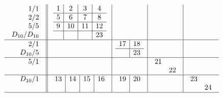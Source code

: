 \documentclass[12pt,a4paper]{amsart}
\begin{document}
\scriptsize {}
\begin{align*}
  \begin{array}{r||c|c|c|c}
    \begin{array}{r}
      1/1 \\ 2/2 \\ 5/5 \\ D_{10}/D_{10}
    \end{array}
    &
    \begin{array}{c|c|c|c}
1&2&3&4\\\hline
5&6&7&8\\\hline
9&10&11&12\\\hline
&&&23\\
    \end{array}
&&&\\\hline
    \begin{array}{r}
      2/1 \\ D_{10}/5
    \end{array}
&&
    \begin{array}{c|c}
      17&18\\\hline
      &23\\
    \end{array}
&&\\\hline
    \begin{array}{r}
      5/1 \\ \\
    \end{array}
&
&
&
  \begin{array}{cc}
21&\\
&22\\
  \end{array}
&\\\hline
    \begin{array}{r}
      D_{10}/1 \\  \\
    \end{array}
&
    \begin{array}{c|c|c|c}
13&14&15&16\\
&&&\\
    \end{array}
&
    \begin{array}{c|c}
      19&20\\
      &\\
    \end{array}
&
&
  \begin{array}{cc}
23&\\
&24\\
  \end{array}
\\\hline
  \end{array}
\end{align*}
\end{document}
